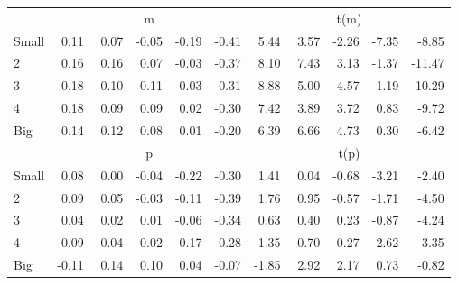 \begin{table}[!ht]
\begin{tabular}{lrrrrrrrrrr}
      & \multicolumn{5}{c}{m} & \multicolumn{5}{c}{t(m)}
    
    \\
      \cmidrule(r){2-6} \cmidrule(r){7-11}

    Small   & 0.11  & 0.07  & -0.05  & -0.19  & -0.41  & 5.44  & 3.57  & -2.26  & -7.35  & -8.85  \\
         2  & 0.16  & 0.16  & 0.07  & -0.03  & -0.37  & 8.10  & 7.43  & 3.13  & -1.37  & -11.47  \\
         3  & 0.18  & 0.10  & 0.11  & 0.03  & -0.31  & 8.88  & 5.00  & 4.57  & 1.19  & -10.29  \\
         4  & 0.18  & 0.09  & 0.09  & 0.02  & -0.30  & 7.42  & 3.89  & 3.72  & 0.83  & -9.72  \\
    Big     & 0.14  & 0.12  & 0.08  & 0.01  & -0.20  & 6.39  & 6.66  & 4.73  & 0.30  & -6.42  \\

  
    
      & \multicolumn{5}{c}{p} & \multicolumn{5}{c}{t(p)}
    
    \\
      \cmidrule(r){2-6} \cmidrule(r){7-11}

    Small   & 0.08  & 0.00  & -0.04  & -0.22  & -0.30  & 1.41  & 0.04  & -0.68  & -3.21  & -2.40  \\
         2  & 0.09  & 0.05  & -0.03  & -0.11  & -0.39  & 1.76  & 0.95  & -0.57  & -1.71  & -4.50  \\
         3  & 0.04  & 0.02  & 0.01  & -0.06  & -0.34  & 0.63  & 0.40  & 0.23  & -0.87  & -4.24  \\
         4  & -0.09  & -0.04  & 0.02  & -0.17  & -0.28  & -1.35  & -0.70  & 0.27  & -2.62  & -3.35  \\
    Big     & -0.11  & 0.14  & 0.10  & 0.04  & -0.07  & -1.85  & 2.92  & 2.17  & 0.73  & -0.82  \\

  

  \bottomrule
\end{tabular}
\label{tbl:25_Size_Var_B2016}
\end{table}